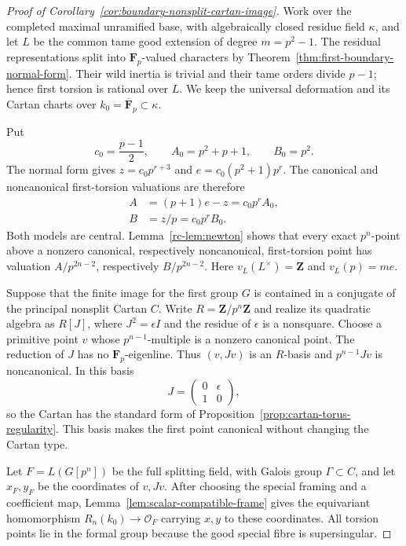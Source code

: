 \begin{proof}[Proof of Corollary~\ref{cor:boundary-nonsplit-cartan-image}]
Work over the completed maximal unramified base, with algebraically
closed residue field $\kappa$, and let $L$ be the common tame good
extension of degree $m=p^2-1$. The residual representations split
into $\mathbf F_p$-valued characters by
Theorem~\ref{thm:first-boundary-normal-form}. Their wild inertia
is trivial and their tame orders divide $p-1$; hence first torsion
is rational over $L$. We keep the universal deformation and its
Cartan charts over $k_0=\overline{\mathbf F}_p\subset\kappa$.

Put
\[
 c_0=\frac{p-1}{2},\qquad A_0=p^2+p+1,\qquad B_0=p^2.
\]
The normal form gives $z=c_0p^{r+3}$ and
$e=c_0(p^2+1)p^r$. The canonical and noncanonical first-torsion
valuations are therefore
\begin{align*}
 A&=(p+1)e-z=c_0p^r A_0,\\
 B&=z/p=c_0p^r B_0.
\end{align*}
Both models are central. Lemma~\ref{rc-lem:newton} shows that every
exact $p^n$-point above a nonzero canonical, respectively
noncanonical, first-torsion point has valuation $A/p^{2n-2}$,
respectively $B/p^{2n-2}$. Here $v_L(L^\times)=\mathbf Z$ and
$v_L(p)=me$.

Suppose that the finite image for the first group $G$ is contained
in a conjugate of the principal nonsplit Cartan $C$. Write
$R=\mathbf Z/p^n\mathbf Z$ and realize its quadratic algebra as
$R[J]$, where $J^2=\epsilon I$ and the residue of $\epsilon$ is a
nonsquare. Choose a primitive point $v$ whose $p^{n-1}$-multiple
is a nonzero canonical point. The reduction of $J$ has no
$\mathbf F_p$-eigenline. Thus $(v,Jv)$ is an $R$-basis and
$p^{n-1}Jv$ is noncanonical. In this basis
\[
                          J=\begin{pmatrix}0&\epsilon\\1&0\end{pmatrix},
\]
so the Cartan has the standard form of
Proposition~\ref{prop:cartan-torus-regularity}. This basis makes
the first point canonical without changing the Cartan type.

Let $F=L(G[p^n])$ be the full splitting field, with Galois group
$\Gamma\subset C$, and let $x_F,y_F$ be the coordinates of
$v,Jv$. After choosing the special framing and a coefficient
map, Lemma~\ref{lem:scalar-compatible-frame} gives the equivariant
homomorphism $R_n(k_0)\to\mathcal O_F$ carrying $x,y$ to these
coordinates. All torsion points lie in the formal group because
the good special fibre is supersingular.


\end{proof}
